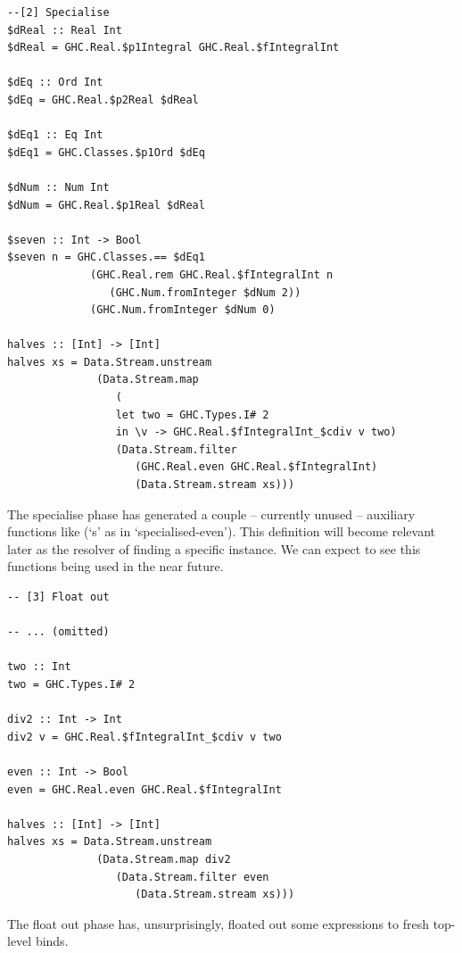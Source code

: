 \begin{listing}[H]
\begin{verbatim}
--[2] Specialise
$dReal :: Real Int
$dReal = GHC.Real.$p1Integral GHC.Real.$fIntegralInt

$dEq :: Ord Int
$dEq = GHC.Real.$p2Real $dReal

$dEq1 :: Eq Int
$dEq1 = GHC.Classes.$p1Ord $dEq

$dNum :: Num Int
$dNum = GHC.Real.$p1Real $dReal

$seven :: Int -> Bool
$seven n = GHC.Classes.== $dEq1
             (GHC.Real.rem GHC.Real.$fIntegralInt n
                (GHC.Num.fromInteger $dNum 2))
             (GHC.Num.fromInteger $dNum 0)

halves :: [Int] -> [Int]
halves xs = Data.Stream.unstream
              (Data.Stream.map
                 (
                 let two = GHC.Types.I# 2
                 in \v -> GHC.Real.$fIntegralInt_$cdiv v two)
                 (Data.Stream.filter
                    (GHC.Real.even GHC.Real.$fIntegralInt)
                    (Data.Stream.stream xs)))
\end{verbatim}
\end{listing}

The specialise phase has generated a couple -- currently unused -- auxiliary functions like  (`s' as in `specialised-even').
This definition will become relevant later as the resolver of finding a specific  instance.
We can expect to see this functions being used in the near future.

\begin{listing}[H]
\begin{verbatim}
-- [3] Float out

-- ... (omitted)

two :: Int
two = GHC.Types.I# 2

div2 :: Int -> Int
div2 v = GHC.Real.$fIntegralInt_$cdiv v two

even :: Int -> Bool
even = GHC.Real.even GHC.Real.$fIntegralInt

halves :: [Int] -> [Int]
halves xs = Data.Stream.unstream
              (Data.Stream.map div2
                 (Data.Stream.filter even
                    (Data.Stream.stream xs)))
\end{verbatim}
\end{listing}

The float out phase has, unsurprisingly, floated out some expressions to fresh top-level binds.

